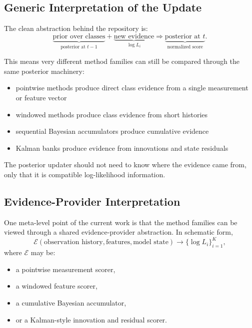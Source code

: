 \documentclass[11pt]{article}
\begin{document}
\subsection{Generic Interpretation of the Update}

The clean abstraction behind the repository is:
\begin{equation}
    \underbrace{\text{prior over classes}}_{\text{posterior at } t-1}
    +
    \underbrace{\text{new evidence}}_{\log L_i}
    \Longrightarrow
    \underbrace{\text{posterior at } t}_{\text{normalized score}}.
\end{equation}

This means very different method families can still be compared through the
same posterior machinery:
\begin{itemize}[leftmargin=1.5em]
    \item pointwise methods produce direct class evidence from a single
    measurement or feature vector
    \item windowed methods produce class evidence from short histories
    \item sequential Bayesian accumulators produce cumulative evidence
    \item Kalman banks produce evidence from innovations and state residuals
\end{itemize}

The posterior updater should not need to know where the evidence came from,
only that it is compatible log-likelihood information.

\subsection{Evidence-Provider Interpretation}

One meta-level point of the current work is that the method families can be
viewed through a shared evidence-provider abstraction. In schematic form,
\begin{equation}
    \mathcal{E}(\text{observation history}, \text{features}, \text{model state})
    \rightarrow
    \{\log L_i\}_{i=1}^K,
\end{equation}
where $\mathcal{E}$ may be:
\begin{itemize}[leftmargin=1.5em]
    \item a pointwise measurement scorer,
    \item a windowed feature scorer,
    \item a cumulative Bayesian accumulator,
    \item or a Kalman-style innovation and residual scorer.
\end{itemize}
\end{document}
